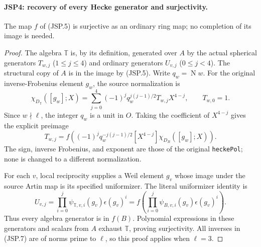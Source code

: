 \paragraph{JSP4: recovery of every Hecke generator and surjectivity.}
\label{claim:JSP4}
The map $f$ of (JSP.5) is surjective as an ordinary ring map;
no completion of its image is needed.
\begin{proof}
The algebra $\mathbb T$ is, by its definition, generated over
$A$ by the actual spherical generators $T_{w,j}$
($1\le j\le4$) and ordinary generators $U_{v,j}$
($0\le j<4$). The structural copy of $A$ is in the image
by (JSP.5). Write $q_w=\operatorname{N}w$.
For the original inverse-Frobenius element $g_w$, the source
normalization is
\[
 \chi_{D_{\mathbb T}}([g_w];X)
   =\sum_{j=0}^{4}(-1)^j q_w^{j(j-1)/2}T_{w,j}X^{4-j},
 \qquad T_{w,0}=1.                                  \tag{JSP.6}
\]
Since $w\nmid\ell$, the integer $q_w$ is a unit in $O$.
Taking the coefficient of $X^{4-j}$ gives the explicit preimage
\[
 T_{w,j}=f\!\left((-1)^j q_w^{-j(j-1)/2}
                  [X^{4-j}]\chi_{D_B}([g_w];X)\right).
 \tag{JSP.7}
\]
The sign, inverse Frobenius, and exponent are those of the
original \texttt{heckePol}; none is changed to a different
normalization.

For each $v$, local reciprocity supplies a Weil element $g_v$
whose image under the source Artin map is its specified
uniformizer. The literal uniformizer identity is
\[
 U_{v,j}=\prod_{i=0}^{j}
       \psi_{\mathbb T,v,i}(g_v)\epsilon(g_v)^i
   =f\!\left(\prod_{i=0}^{j}\psi_{B,v,i}(g_v)\epsilon(g_v)^i\right).
 \tag{JSP.8}
\]
Thus every algebra generator is in $f(B)$. Polynomial
expressions in these generators and scalars from $A$ exhaust
$\mathbb T$, proving surjectivity. All inverses in (JSP.7)
are of norms prime to $\ell$, so this proof applies when
$\ell=3$.
\end{proof}


